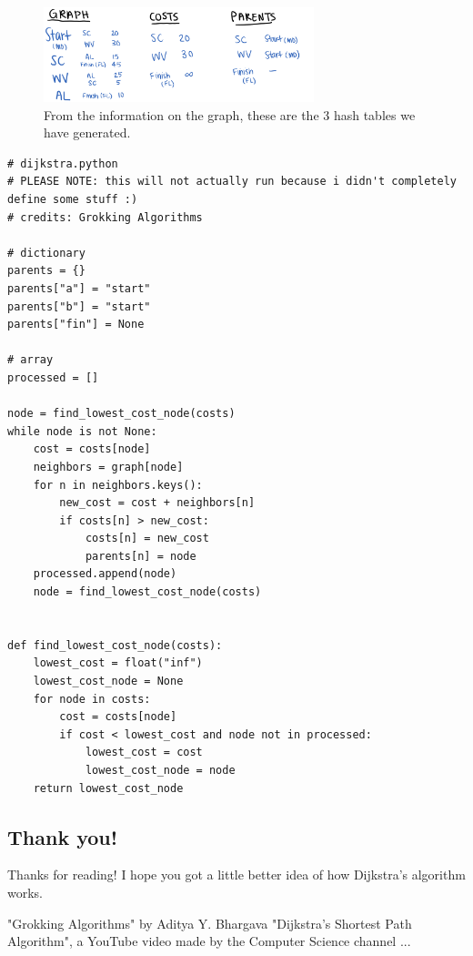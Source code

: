 \documentclass{article}
\begin{document}
\begin{figure}
    \centering
    \includegraphics[width=0.7\textwidth]{3hashtables.png}
    \caption{From the information on the graph, these are the 3 hash tables we have generated.}
    \label{fig:my_label}
\end{figure}


\begin{lstlisting}
# dijkstra.python
# PLEASE NOTE: this will not actually run because i didn't completely define some stuff :)
# credits: Grokking Algorithms

# dictionary
parents = {}
parents["a"] = "start"
parents["b"] = "start"
parents["fin"] = None

# array
processed = []

node = find_lowest_cost_node(costs)
while node is not None:
    cost = costs[node]
    neighbors = graph[node]
    for n in neighbors.keys():
        new_cost = cost + neighbors[n]
        if costs[n] > new_cost:
            costs[n] = new_cost
            parents[n] = node
    processed.append(node)
    node = find_lowest_cost_node(costs)


def find_lowest_cost_node(costs):
    lowest_cost = float("inf")
    lowest_cost_node = None
    for node in costs:
        cost = costs[node]
        if cost < lowest_cost and node not in processed:
            lowest_cost = cost
            lowest_cost_node = node
    return lowest_cost_node

\end{lstlisting}

\subsection{Thank you!}

Thanks for reading! I hope you got a little better idea of how Dijkstra's algorithm works.

% 
% 

\begin{thebibliography}{widest entry}
  "Grokking Algorithms" by Aditya Y. Bhargava
  "Dijkstra’s Shortest Path Algorithm", a YouTube video made by the Computer Science channel
 ...
\end{thebibliography}
\end{document}
